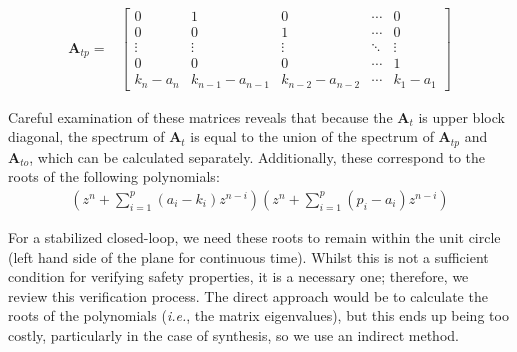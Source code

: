 \documentclass[runningheads,a4paper]{llncs}
\newcommand{\mat}[1]{\boldsymbol{#1}}
\begin{document}
\begin{align*}
\mat{A}_{tp}=&\left[
\begin{array}{ccccc}
0&1&0&\cdots&0\\
0&0&1&\cdots&0\\
\vdots&\vdots&\vdots&\ddots&\vdots\\
0&0&0&\cdots&1\\
k_n-a_n&k_{n-1}-a_{n-1}&k_{n-2}-a_{n-2}&\cdots&k_1-a_1
\end{array}\right]
\label{eq:cf_SISO_2}
\end{align*}

Careful examination of these matrices reveals that because the $\mat{A}_t$ is 
upper block diagonal, the spectrum of $\mat{A}_t$ is equal to the union of the 
spectrum of $\mat{A}_{tp}$ and $\mat{A}_{to}$, which can be calculated separately. 
Additionally, these correspond to the roots of the following polynomials:
%
\begin{align*}
\left(z^n+\sum_{i=1}^p{(a_i-k_i)z^{n-i}}\right) \left(z^n+\sum_{i=1}^p{(p_i-a_i)z^{n-i}}\right)
\end{align*}

For a stabilized closed-loop, we need these roots to remain within the
unit circle (left hand side of the plane for continuous time).  Whilst
this is not a sufficient condition for verifying safety properties, it
is a necessary one; therefore, we review this verification process.  
The direct approach would be to calculate the roots of the
polynomials (\emph{i.e.}, the matrix eigenvalues), but this ends
up being too costly, particularly in the case of synthesis, so we use
an indirect method.
\end{document}
